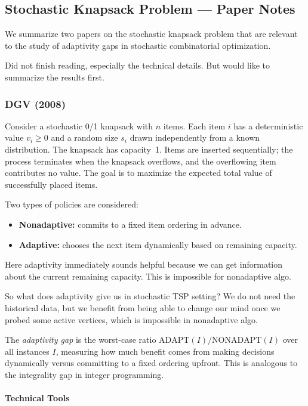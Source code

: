 \subsection{Stochastic Knapsack Problem --- Paper Notes}\label{sec:sk-notes}

We summarize two papers on the stochastic knapsack problem that are relevant to the study of adaptivity gaps in stochastic combinatorial optimization.

Did not finish reading, especially the technical details. But would like to summarize the results first.

\subsubsection{DGV (2008)}

Consider a stochastic 0/1 knapsack with $n$ items. Each item $i$ has a deterministic value $v_i \ge 0$ and a random size $s_i$ drawn independently from a known distribution. The knapsack has capacity~1. Items are inserted sequentially; the process terminates when the knapsack overflows, and the overflowing item contributes no value. The goal is to maximize the expected total value of successfully placed items.

Two types of policies are considered:
\begin{itemize}
    \item \textbf{Nonadaptive:} commits to a fixed item ordering in advance.
    \item \textbf{Adaptive:} chooses the next item dynamically based on remaining capacity.
\end{itemize}

Here adaptivity immediately sounds helpful because we can get information about the current remaining capacity. This is impossible for nonadaptive algo. 

So what does adaptivity give us in stochastic TSP setting? We do not need the historical data, but we benefit from being able to change our mind once we probed some active vertices, which is impossible in nonadaptive algo. 

The \emph{adaptivity gap} is the worst-case ratio $\mathrm{ADAPT}(I) / \mathrm{NONADAPT}(I)$ over all instances $I$, measuring how much benefit comes from making decisions dynamically versus committing to a fixed ordering upfront. This is analogous to the integrality gap in integer programming.

\paragraph{Technical Tools}

